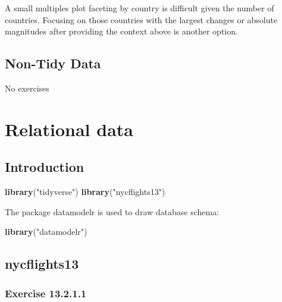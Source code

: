 \documentclass[]{book}
\newenvironment{Shaded}{\begin{snugshade}}{\end{snugshade}}
\newcommand{\KeywordTok}[1]{\textcolor[rgb]{0.13,0.29,0.53}{\textbf{#1}}}
\newcommand{\NormalTok}[1]{#1}
\newcommand{\StringTok}[1]{\textcolor[rgb]{0.31,0.60,0.02}{#1}}
\theoremstyle{plain}
\theoremstyle{remark}
\begin{document}
A small multiples plot faceting by country is difficult given the number of countries.
Focusing on those countries with the largest changes or absolute magnitudes after providing the context above is another option.

\hypertarget{non-tidy-data}{%
\section{Non-Tidy Data}\label{non-tidy-data}}

No exercises

\hypertarget{relational-data}{%
\chapter{Relational data}\label{relational-data}}

\hypertarget{introduction-8}{%
\section{Introduction}\label{introduction-8}}

\begin{Shaded}
\begin{Highlighting}[]
\KeywordTok{library}\NormalTok{(}\StringTok{"tidyverse"}\NormalTok{)}
\KeywordTok{library}\NormalTok{(}\StringTok{"nycflights13"}\NormalTok{)}
\end{Highlighting}
\end{Shaded}

The package datamodelr is used to draw database schema:

\begin{Shaded}
\begin{Highlighting}[]
\KeywordTok{library}\NormalTok{(}\StringTok{"datamodelr"}\NormalTok{)}
\end{Highlighting}
\end{Shaded}

\hypertarget{nycflights13}{%
\section{nycflights13}\label{nycflights13}}

\hypertarget{exercise-13.2.1.1}{%
\subsection*{\texorpdfstring{Exercise {13.2.1.1}}{Exercise 13.2.1.1}}\label{exercise-13.2.1.1}}
\end{document}

